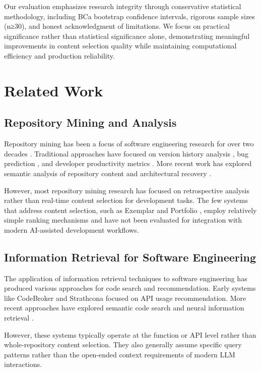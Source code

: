 \documentclass[conference]{IEEEtran}
\begin{document}
Our evaluation emphasizes research integrity through conservative statistical methodology, including BCa bootstrap confidence intervals, rigorous sample sizes (n≥30), and honest acknowledgment of limitations. We focus on practical significance rather than statistical significance alone, demonstrating meaningful improvements in content selection quality while maintaining computational efficiency and production reliability.

\section{Related Work}

\subsection{Repository Mining and Analysis}

Repository mining has been a focus of software engineering research for over two decades \cite{kagdi2007survey}. Traditional approaches have focused on version history analysis \cite{hassan2008road}, bug prediction \cite{d2010extensive}, and developer productivity metrics \cite{mockus2002two}. More recent work has explored semantic analysis of repository content \cite{bavota2013methodbook} and architectural recovery \cite{ducasse2009software}.

However, most repository mining research has focused on retrospective analysis rather than real-time content selection for development tasks. The few systems that address content selection, such as Exemplar \cite{zhang2012exemplar} and Portfolio \cite{mcmillan2011portfolio}, employ relatively simple ranking mechanisms and have not been evaluated for integration with modern AI-assisted development workflows.

\subsection{Information Retrieval for Software Engineering}

The application of information retrieval techniques to software engineering has produced various approaches for code search and recommendation. Early systems like CodeBroker \cite{ye2001codebroker} and Strathcona \cite{holmes2006strathcona} focused on API usage recommendation. More recent approaches have explored semantic code search \cite{lv2015codehow} and neural information retrieval \cite{gu2016deep}.

However, these systems typically operate at the function or API level rather than whole-repository content selection. They also generally assume specific query patterns rather than the open-ended context requirements of modern LLM interactions.
\end{document}
